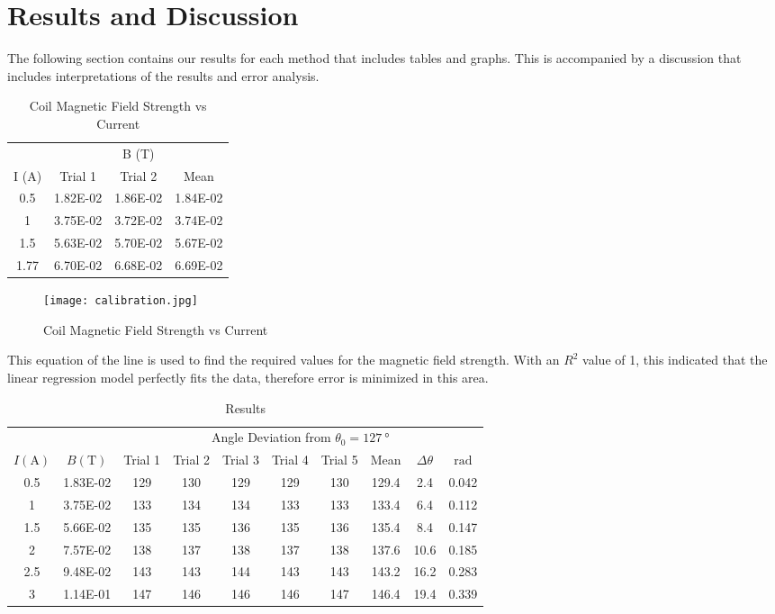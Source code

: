 \documentclass[11pt]{article}
\begin{document}
	\section{Results and Discussion}

	The following section contains our results for each method that includes tables and graphs. This is accompanied by a discussion that includes interpretations of the results and error analysis.


	\begin{table}[htbp]
		\centering
		\caption{Coil Magnetic Field Strength vs Current}
		\begin{tabular}{cccc}
			\toprule
			& \multicolumn{3}{c}{B (T)} \\
			\cmidrule{2-4}    I (A) & Trial 1 & Trial 2 & Mean \\
			\midrule
			0.5 & 1.82E-02 & 1.86E-02 & 1.84E-02 \\
			1 & 3.75E-02 & 3.72E-02 & 3.74E-02 \\
			1.5 & 5.63E-02 & 5.70E-02 & 5.67E-02 \\
			1.77 & 6.70E-02 & 6.68E-02 & 6.69E-02 \\
			\bottomrule
		\end{tabular}%
		\label{tab:calibration}%
	\end{table}%

	\begin{figure}[htbp]
		\centering
		\caption{Coil Magnetic Field Strength vs Current}
		\texttt{[image: calibration.jpg]}
	\end{figure}
	This equation of the line is used to find the required values for the magnetic field strength. With an $R^2$ value of 1, this indicated that the linear regression model perfectly fits the data, therefore error is minimized in this area.

\clearpage

	\begin{table}[htbp]
		\centering
		\caption{Results}
		\begin{tabular}{cccccccccc}
			\toprule
			&   & \multicolumn{8}{c}{Angle Deviation from $\theta_0 = \qty{127}{\degree}$} \\
			\cmidrule{3-10}    $I (\unit{\ampere})$ & $B (\unit{\tesla})$ & Trial 1 & Trial 2 & Trial 3 & Trial 4 & Trial 5 & Mean & $\Delta \theta$ & $\unit{\radian}$ \\
			\midrule
			0.5 & 1.83E-02 & 129 & 130 & 129 & 129 & 130 & 129.4 & 2.4 & 0.042 \\
			1 & 3.75E-02 & 133 & 134 & 134 & 133 & 133 & 133.4 & 6.4 & 0.112 \\
			1.5 & 5.66E-02 & 135 & 135 & 136 & 135 & 136 & 135.4 & 8.4 & 0.147 \\
			2 & 7.57E-02 & 138 & 137 & 138 & 137 & 138 & 137.6 & 10.6 & 0.185 \\
			2.5 & 9.48E-02 & 143 & 143 & 144 & 143 & 143 & 143.2 & 16.2 & 0.283 \\
			3 & 1.14E-01 & 147 & 146 & 146 & 146 & 147 & 146.4 & 19.4 & 0.339 \\
			\bottomrule
		\end{tabular}%
		\label{tab:results}%
	\end{table}%
\end{document}
